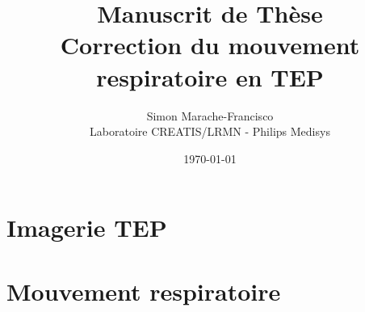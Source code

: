 \documentclass[12pt]{book}
\title{\Huge{Manuscrit de Thèse}\\\Large{Correction du mouvement respiratoire en TEP}}
\author{
        Simon Marache-Francisco \\
        Laboratoire CREATIS/LRMN - Philips Medisys
}
\date{\today}
\begin{document}
\sloppy

\addtolength{\parskip}{0.5em}




\newcommand{\todo}[1]{
\addcontentsline{toc}{subsection}{\textbf{Todo:} #1}
$\|$\textbf{A Faire : }#1$\|$
}



\maketitle

\thispagestyle{empty}



\newpage

\tableofcontents


\newpage
{}
	

\part{Imagerie TEP}
		
			

\part{Mouvement respiratoire}
%	
\end{document}
